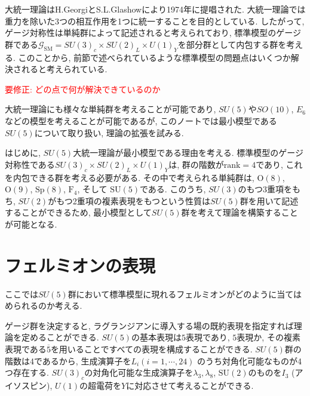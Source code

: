 %
%
大統一理論はH.GeorgiとS.L.Glashowにより1974年に提唱された\cite{PhysRevLett.32.438}.
大統一理論では重力を除いた3つの相互作用を1つに統一することを目的としている.
したがって, ゲージ対称性は単純群によって記述されると考えられており, 標準模型のゲージ群である$\mathcal{G}_\text{SM}= SU(3)_c\times SU(2)_L\times U(1)_Y$を部分群として内包する群を考える.
このことから, 前節で述べられているような標準模型の問題点はいくつか解決されると考えられている.

\textcolor{red}{要修正: どの点で何が解決できているのか}

大統一理論にも様々な単純群を考えることが可能であり, $SU(5)$や$SO(10)$, $E_6$などの模型を考えることが可能であるが, このノートでは最小模型である$SU(5)$について取り扱い, 理論の拡張を試みる.

はじめに, $SU(5)$大統一理論が最小模型である理由を考える.
標準模型のゲージ対称性である$SU(3)_c\times SU(2)_L\times U(1)_Y$は, 群の階数が$\text{rank}=4$であり, これを内包できる群を考える必要がある.
その中で考えられる単純群は, $\text{O}(8)$, $\mathrm{O}(9)$, $\mathrm{Sp}(8)$, $\mathrm{F}_4$, そして $\mathrm{SU}(5)$である.
このうち, $SU(3)$のもつ3重項をもち, $SU(2)$がもつ2重項の複素表現をもつという性質は$SU(5)$群を用いて記述することができるため, 最小模型として$SU(5)$群を考えて理論を構築することが可能となる.

\section{フェルミオンの表現}
ここでは$SU(5)$群において標準模型に現れるフェルミオンがどのように当てはめられるのか考える.

ゲージ群を決定すると, ラグランジアンに導入する場の既約表現を指定すれば理論を定めることができる.
$SU(5)$の基本表現は$5$表現であり, $5$表現か, その複素表現である$\overline{5}$を用いることですべての表現を構成することができる.
$SU(5)$群の階数は4であるから, 生成演算子を$L_i$$(i=1,\cdots,24)$ のうち対角化可能なものが4つ存在する.
$SU(3)_c$の対角化可能な生成演算子を$\lambda_3,\lambda_8$, $\mathrm{SU}(2)$のものを$I_3$ (アイソスピン), $U(1)$の超電荷を$Y$に対応させて考えることができる.

